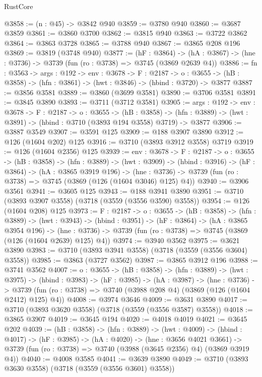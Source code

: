 \begin{lexlean}{RustCore}
\begin{coremodule}
@3858 := (n : @45) -> @3842 @940
@3859 := @3780 @940
@3860 := @3687 @3859
@3861 := @3860 @3700
@3862 := @3815 @940
@3863 := @3722 @3862
@3864 := @3863 @3728
@3865 := @3788 @940
@3867 := @3865 @208 @196
@3869 := @3819 (@3748 @940)
@3877 := (hF : @3864) ->
  (hA : @3867) -> (hne : @3736) -> @3739 (fun (ro : @3738) => @3745 (@3869 @2639 @4))
@3886 := {fn : @3563} ->
  {args : @192} ->
  {env : @3678} ->
  {F : @2187} ->
  {o : @3655} -> (hB : @3858) -> (hfn : @3861) -> (hwt : @3846) -> (hbind : @3720) -> @3877
@3887 := @3856 @3581
@3889 := @3860 (@3699 @3581)
@3890 := @3706 @3581
@3891 := @3845 @3890
@3893 := @3711 (@3712 @3581)
@3905 := {args : @192} ->
  {env : @3678} ->
  {F : @2187} ->
  {o : @3655} ->
  (hB : @3858) ->
  (hfn : @3889) -> (hwt : @3891) -> (hbind : @3710 (@3893 @194 @3558) @3719) -> @3877
@3906 := @3887 @3549
@3907 := @3591 @125
@3909 := @188 @3907 @3890
@3912 := @126 (@1604 @202) @125
@3916 := @3710 (@3893 @3912 @3558) @3719
@3919 := @126 (@1604 @2356) @125
@3939 := {env : @3678} ->
  {F : @2187} ->
  {o : @3655} ->
  (hB : @3858) ->
  (hfn : @3889) ->
  (hwt : @3909) ->
  (hbind : @3916) ->
  (hF : @3864) ->
  (hA : @3865 @3919 @196) ->
  (hne : @3736) -> @3739 (fun (ro : @3738) => @3745 (@3869 (@126 (@1604 @3046) @125) @4))
@3940 := @3906 @3561
@3941 := @3605 @125
@3943 := @188 @3941 @3890
@3951 := @3710 (@3893 @3907 @3558) (@3718 (@3559 (@3556 @3590) @3558))
@3954 := @126 (@1604 @208) @125
@3973 := {F : @2187} ->
  {o : @3655} ->
  (hB : @3858) ->
  (hfn : @3889) ->
  (hwt : @3943) ->
  (hbind : @3951) ->
  (hF : @3864) ->
  (hA : @3865 @3954 @196) ->
  (hne : @3736) -> @3739 (fun (ro : @3738) => @3745 (@3869 (@126 (@1604 @2639) @125) @4))
@3974 := @3940 @3562
@3975 := @3621 @3890
@3983 := @3710 (@3893 @3941 @3558) (@3718 (@3559 (@3556 @3604) @3558))
@3985 := @3863 (@3727 @3562)
@3987 := @3865 @3912 @196
@3988 := @3741 @3562
@4007 := {o : @3655} ->
  (hB : @3858) ->
  (hfn : @3889) ->
  (hwt : @3975) ->
  (hbind : @3983) ->
  (hF : @3985) ->
  (hA : @3987) ->
  (hne : @3736) ->
  @3739 (fun (ro : @3738) => @3740 (@3988 @208 @4) (@3869 (@126 (@1604 @2412) @125) @4))
@4008 := @3974 @3646
@4009 := @3631 @3890
@4017 := @3710 (@3893 @3620 @3558) (@3718 (@3559 (@3556 @3587) @3558))
@4018 := @3865 @3907
@4019 := @3645 @194
@4020 := @4018 @4019
@4021 := @3645 @202
@4039 := (hB : @3858) ->
  (hfn : @3889) ->
  (hwt : @4009) ->
  (hbind : @4017) ->
  (hF : @3985) ->
  (hA : @4020) ->
  (hne : @3656 @4021 @3661) ->
  @3739 (fun (ro : @3738) => @3740 (@3988 (@3645 @2356) @4) (@3869 @3919 @4))
@4040 := @4008 @3585
@4041 := @3639 @3890
@4049 := @3710 (@3893 @3630 @3558) (@3718 (@3559 (@3556 @3601) @3558))

\end{coremodule}
\end{lexlean}
